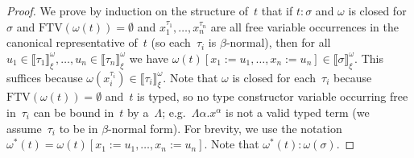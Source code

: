 \documentclass[a4paper,UKenglish,cleveref,autoref,numberwithinsect]{lipics-v2019}
\theoremstyle{definition}
\newcommand{\subst}[2]{#1:=#2}
\newcommand{\FTV}{\mathrm{FTV}}
\newcommand{\val}[3]{\ensuremath{\llbracket#1\rrbracket_{#2}^{#3}}}
\begin{document}
\begin{proof}
  We prove by induction on the structure of~$t$ that if $t : \sigma$
  and $\omega$ is closed for~$\sigma$ and $\FTV(\omega(t)) =
  \emptyset$ and $x_1^{\tau_1},\ldots,x_n^{\tau_n}$ are all free
  variable occurrences in the canonical representative of~$t$ (so
  each~$\tau_i$ is $\beta$-normal), then for all
  $u_1\in\val{\tau_1}{\xi}{\omega},\ldots,u_n\in\val{\tau_n}{\xi}{\omega}$
  we have $\omega(t)[\subst{x_1}{u_1},\ldots,\subst{x_n}{u_n}] \in
  \val{\sigma}{\xi}{\omega}$. This suffices because
  $\omega(x_i^{\tau_i}) \in \val{\tau_i}{\xi}{\omega}$. Note that
  $\omega$ is closed for each~$\tau_i$ because $\FTV(\omega(t)) =
  \emptyset$ and~$t$ is typed, so no type constructor variable
  occurring free in~$\tau_i$ can be bound in~$t$ by a~$\Lambda$;
  e.g.~$\Lambda \alpha . x^\alpha$ is not a valid typed term (we
  assume~$\tau_i$ to be in $\beta$-normal form). For brevity, we use
  the notation $\omega^*(t) =
  \omega(t)[\subst{x_1}{u_1},\ldots,\subst{x_n}{u_n}]$. Note that
  $\omega^*(t) : \omega(\sigma)$.


\end{proof}
\end{document}
